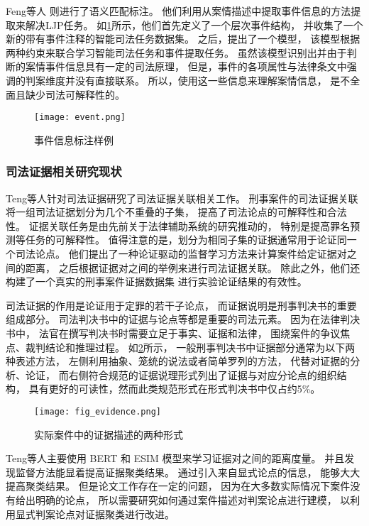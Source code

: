 Feng等人
则进行了语义匹配标注。
他们利用从案情描述中提取事件信息的方法提取来解决LJP任务。
如\cref{event}所示，他们首先定义了一个层次事件结构，
并收集了一个新的带有事件注释的智能司法任务数据集。
之后，提出了一个模型，
该模型根据两种约束来联合学习智能司法任务和事件提取任务。
虽然该模型识别出并由于判断的案情事件信息具有一定的司法原理，
但是，事件的各项属性与法律条文中强调的判案维度并没有直接联系。
所以，使用这一些信息来理解案情信息，
是不全面且缺少司法可解释性的。

\begin{figure}[h]
	\centering
	\texttt{[image: event.png]}
	\caption{事件信息标注样例}
	\label{event}
\end{figure}

\subsubsection{司法证据相关研究现状}

Teng等人针对司法证据研究了司法证据关联相关工作。
刑事案件的司法证据关联将一组司法证据划分为几个不重叠的子集，
提高了司法论点的可解释性和合法性。
证据关联任务是由先前关于法律辅助系统的研究推动的，
特别是提高罪名预测等任务的可解释性。
值得注意的是，划分为相同子集的证据通常用于论证同一个司法论点。
他们提出了一种论证驱动的监督学习方法来计算案件给定证据对之间的距离，
之后根据证据对之间的举例来进行司法证据关联。
除此之外，他们还构建了一个真实的刑事案件证据数据集
进行实验论证结果的有效性。

司法证据的作用是论证用于定罪的若干子论点，
而证据说明是刑事判决书的重要组成部分。
司法判决书中的证据与论点等都是重要的司法元素。
因为在法律判决书中，
法官在撰写判决书时需要立足于事实、证据和法律，
围绕案件的争议焦点、裁判结论和推理过程。
如\cref{fig_evidence}所示，
一般刑事判决书中证据部分通常为以下两种表述方法，
左侧利用抽象、笼统的说法或者简单罗列的方法，
代替对证据的分析、论证，
而右侧符合规范的证据说理形式列出了证据与对应分论点的组织结构，
具有更好的可读性，然而此类规范形式在形式判决书中仅占约5\%。

\begin{figure}[h]
	\centering
	\texttt{[image: fig\_evidence.png]}
	\caption{实际案件中的证据描述的两种形式}
	\label{fig_evidence}
\end{figure}

Teng等人主要使用 BERT
和 ESIM 模型来学习证据对之间的距离度量。
并且发现监督方法能显着提高证据聚类结果。
通过引入来自显式论点的信息，
能够大大提高聚类结果。
但是论文工作存在一定的问题，
因为在大多数实际情况下案件没有给出明确的论点，
所以需要研究如何通过案件描述对判案论点进行建模，
以利用显式判案论点对证据聚类进行改进。

